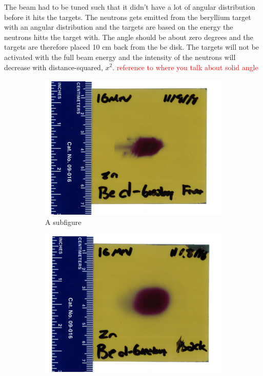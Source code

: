 \documentclass[twoside,english]{uiofysmaster/uiofysmaster}
\begin{document}
The beam had to be tuned such that it didn't have a lot of angular distribution before it hits the targets. The neutrons gets emitted from the beryllium target with an angular distribution and the targets are based on the energy the neutrons hitts the target with. The angle should be about zero degrees and the targets are therefore placed 10 cm back from the be disk. The targets will not be activated with the full beam energy and the intensity of the neutrons will decrease with distance-squared, $x^2$. \textcolor{red}{reference to where you talk about solid angle}

\begin{figure} [H]
\centering
\begin{subfigure}{.5\textwidth}
  \centering
  \includegraphics[width=1\linewidth]{16MeV_front.jpeg}
  \caption{A subfigure}
  \label{fig:sub1}
\end{subfigure}%
\begin{subfigure}{.5\textwidth}
  \centering
  \includegraphics[width=1\linewidth]{16MeV_back.jpeg}

\end{subfigure}
\end{figure}
\end{document}
